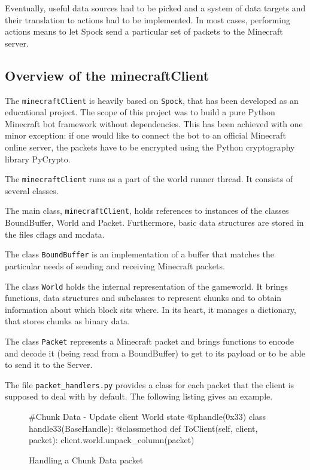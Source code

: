 Eventually, useful data sources had to be picked and a system of data targets and their translation to actions had to be implemented. In most cases, performing actions means to let Spock send a particular set of packets to the Minecraft server.

        \subsection{Overview of the minecraftClient}
The \texttt{minecraftClient} is heavily based on \texttt{Spock}, that has been developed as an educational project. The scope of this project was to build a pure Python Minecraft bot framework without dependencies. This has been achieved with one minor exception: if one would like to connect the bot to an official Minecraft online server, the packets have to be encrypted using the Python cryptography library PyCrypto.

The \texttt{minecraftClient} runs as a part of the world runner thread. It consists of several classes. 

The main class, \texttt{minecraftClient}, holds references to instances of the classes BoundBuffer,  World and Packet. Furthermore, basic data structures are stored in the files cflags and mcdata.

The class \texttt{BoundBuffer} is an implementation of a buffer that matches the particular needs of sending and receiving Minecraft packets.

The class \texttt{World} holds the internal representation of the gameworld. It brings functions, data structures and subclasses to represent chunks and to obtain information about which block sits where. In its heart, it manages a dictionary, that stores chunks as binary data.

The class \texttt{Packet} represents a Minecraft packet and brings functions to encode and decode it (being read from a BoundBuffer) to get to its payload or to be able to send it to the Server.

The file \texttt{packet\_handlers.py} provides a class for each packet that the client is supposed to deal with by default. The following listing gives an example.


		\begin{figure}[ht]
			\centering
			\begin{minipage}{11cm}
				\begin{pseudocode}
#Chunk Data - Update client World state
@phandle(0x33)
class handle33(BaseHandle):
	@classmethod
	def ToClient(self, client, packet):
		client.world.unpack_column(packet)
					\end{pseudocode}
				\caption{Handling a Chunk Data packet}
				\label{packet_handling}
			\end{minipage}
		\end{figure}


